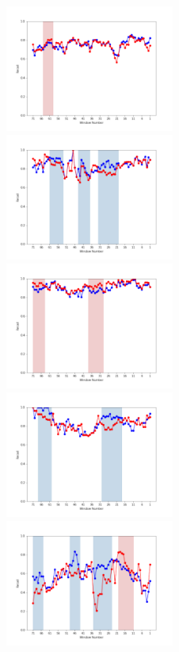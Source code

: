 \documentclass[11pt]{jreport}
\begin{document}
\begin{figure}[H]
\begin{center}
    \includegraphics[width=0.495\textwidth]{Uenaka_fig/RQ1_result/Nova_review_Recall.pdf}
    \includegraphics[width=0.495\textwidth]{Uenaka_fig/RQ1_result/Neutron_review_Recall.pdf}
    \includegraphics[width=0.495\textwidth]{Uenaka_fig/RQ1_result/Cinder_review_Recall.pdf}
    \includegraphics[width=0.495\textwidth]{Uenaka_fig/RQ1_result/Keystone_review_Recall.pdf}
    \includegraphics[width=0.495\textwidth]{Uenaka_fig/RQ1_result/Swift_review_Recall.pdf}

\end{center}
\end{figure}
\end{document}
